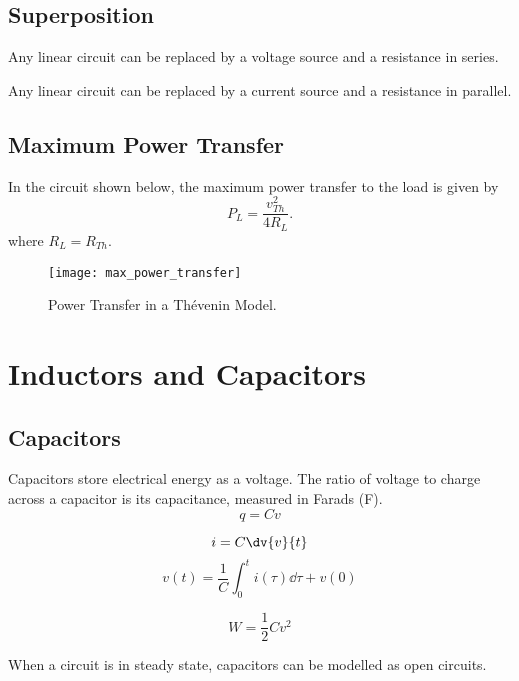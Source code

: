 \documentclass{article}
\begin{document}
\subsection{Superposition}
\begin{theorem}
    Any linear circuit can be replaced by a voltage source and a resistance in series.
\end{theorem}
\begin{theorem}
    Any linear circuit can be replaced by a current source and a resistance in parallel.
\end{theorem}
\subsection{Maximum Power Transfer}
In the circuit shown below, the maximum power transfer to the load is given by
\begin{equation*}
    P_L = \frac{v_{Th}^2}{4R_L}.
\end{equation*}
where $R_L = R_{Th}$.
\begin{figure}[H]
    \centering
    \texttt{[image: max\_power\_transfer]}
    \caption{Power Transfer in a Thévenin Model.}
\end{figure}
\newpage
\section{Inductors and Capacitors}
\subsection{Capacitors}
\begin{definition}
    Capacitors store electrical energy as a voltage. The ratio of voltage
    to charge across a capacitor is its capacitance, measured in Farads (\si{\farad}).
    \begin{equation*}
        q = C v
    \end{equation*}
\end{definition}
\begin{definition}[VI Relationship]
    \begin{equation*}
        i = C \dv{v}{t}
    \end{equation*}
    \begin{equation*}
        v(t) = \frac{1}{C} \int_0^t i(\tau) \dd{\tau} + v(0)
    \end{equation*}
\end{definition}
\begin{definition}
    \begin{equation*}
        W = \frac{1}{2}Cv^2
    \end{equation*}
\end{definition}
\begin{theorem}
    When a circuit is in steady state, capacitors can be modelled as open circuits.
\end{theorem}
\end{document}
